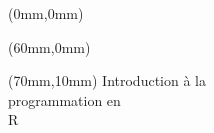 \sffamily

\newlength{\gauche}
\addtolength{\gauche}{72mm}
\addtolength{\gauche}{-\spinemargin}

\setlength{\ruleheight}{279mm}


\newcommand{\banderecto}{%
  \begin{textblock*}{60mm}[0,1](0mm,0mm)
    \textblockcolor{spine} \rule{0mm}{\ruleheight}
  \end{textblock*}
  \begin{textblock*}{144mm}[0,1](72mm,-46.5mm)
    \textblockcolor{white} \rule{0mm}{\ruleheight}
  \end{textblock*}}
\newcommand{\bandeverso}{%
  \begin{textblock*}{144mm}[0,1](0mm,-46.5mm)
    \textblockcolor{gray} \rule{0mm}{\ruleheight}
  \end{textblock*}
  \begin{textblock*}{71.5mm}[0,1](144.5mm,-46.5mm)
    \textblockcolor{black} \rule{0mm}{\ruleheight}
  \end{textblock*}}

\begin{textblock*}{60mm}(0mm,0mm)
   \rule{0mm}{279mm}
\end{textblock*}
\begin{textblock*}{156mm}(60mm,0mm)
   \rule{0mm}{279mm}
\end{textblock*}
\begin{textblock*}{136mm}(70mm,10mm)
  \sffamily
  \HUGE
    \selectfont Introduction
    \selectfont  à la \\[0mm]
    \selectfont programmation
    \selectfont  en \\
    \selectfont R
\end{textblock*}

